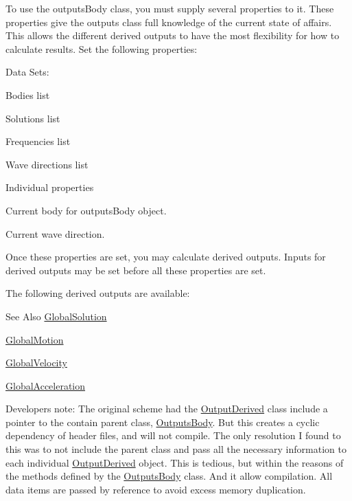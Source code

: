 To use the outputs\-Body class, you must supply several properties to it. These properties give the outputs class full knowledge of the current state of affairs. This allows the different derived outputs to have the most flexibility for how to calculate results. Set the following properties\-:

Data Sets\-:
\begin{DoxyEnumerate}
\item Bodies list
\item Solutions list
\item Frequencies list
\item Wave directions list
\end{DoxyEnumerate}

Individual properties
\begin{DoxyEnumerate}
\item Current body for outputs\-Body object.
\item Current wave direction.
\end{DoxyEnumerate}

Once these properties are set, you may calculate derived outputs. Inputs for derived outputs may be set before all these properties are set.

The following derived outputs are available\-: \begin{DoxySeeAlso}{See Also}
\hyperlink{classosea_1_1ofreq_1_1_global_solution}{Global\-Solution} 

\hyperlink{classosea_1_1ofreq_1_1_global_motion}{Global\-Motion} 

\hyperlink{classosea_1_1ofreq_1_1_global_velocity}{Global\-Velocity} 

\hyperlink{classosea_1_1ofreq_1_1_global_acceleration}{Global\-Acceleration}
\end{DoxySeeAlso}
Developers note\-: The original scheme had the \hyperlink{classosea_1_1ofreq_1_1_output_derived}{Output\-Derived} class include a pointer to the contain parent class, \hyperlink{classosea_1_1ofreq_1_1_outputs_body}{Outputs\-Body}. But this creates a cyclic dependency of header files, and will not compile. The only resolution I found to this was to not include the parent class and pass all the necessary information to each individual \hyperlink{classosea_1_1ofreq_1_1_output_derived}{Output\-Derived} object. This is tedious, but within the reasons of the methods defined by the \hyperlink{classosea_1_1ofreq_1_1_outputs_body}{Outputs\-Body} class. And it allow compilation. All data items are passed by reference to avoid excess memory duplication. 

